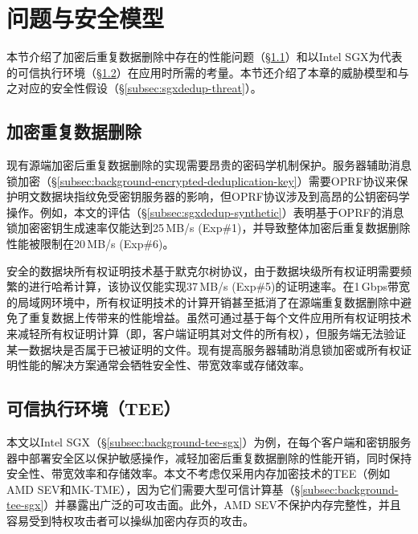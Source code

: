\section{问题与安全模型}
\label{sec:sgxdedup-background}

本节介绍了加密后重复数据删除中存在的性能问题（\S\ref{subsec:sgxdedup-problem}）和以Intel SGX为代表的可信执行环境（\S\ref{subsec:sgxdedup-sgx}）在应用时所需的考量。本节还介绍了本章的威胁模型和与之对应的安全性假设（\S\ref{subsec:sgxdedup-threat}）。

\subsection{加密重复数据删除}
\label{subsec:sgxdedup-problem}

现有源端加密后重复数据删除的实现需要昂贵的密码学机制保护。服务器辅助消息锁加密（\S\ref{subsec:background-encrypted-deduplication-key}）需要OPRF协议\cite{naor2004Number}来保护明文数据块指纹免受密钥服务器的影响，但OPRF协议涉及到高昂的公钥密码学操作。例如，本文的评估（\S\ref{subsec:sgxdedup-synthetic}）表明基于OPRF的消息锁加密密钥生成速率仅能达到25\,MB/s (Exp\#1)，并导致整体加密后重复数据删除性能被限制在20\,MB/s (Exp\#6)。

安全的数据块所有权证明技术基于默克尔树协议，由于数据块级所有权证明需要频繁的进行哈希计算，该协议仅能实现37\,MB/s (Exp\#5)的证明速率。在1\,Gbps带宽的局域网环境中，所有权证明技术的计算开销甚至抵消了在源端重复数据删除中避免了重复数据上传带来的性能增益。虽然可通过基于每个文件应用所有权证明技术来减轻所有权证明计算（即，客户端证明其对文件的所有权），但服务端无法验证某一数据块是否属于已被证明的文件。现有提高服务器辅助消息锁加密或所有权证明性能的解决方案通常会牺牲安全性\cite{li2020TED,xu2013weak,pietro12}、带宽效率\cite{harnik2010side,li15}或存储效率\cite{zhou2015secdep,qin17,li2020TED}。


\subsection{可信执行环境（TEE）}
\label{subsec:sgxdedup-sgx} 

本文以Intel SGX\cite{sgx}（\S\ref{subsec:background-tee-sgx}）为例，在每个客户端和密钥服务器中部署安全区以保护敏感操作，减轻加密后重复数据删除的性能开销，同时保持安全性、带宽效率和存储效率。本文不考虑仅采用内存加密技术的TEE（例如AMD SEV\cite{AMDSEV}和MK-TME\cite{MK-TME}），因为它们需要大型可信计算基（\S\ref{subsec:background-tee-sgx}）并暴露出广泛的可攻击面\cite{mofrad18}。此外，AMD SEV\cite{AMDSEV}不保护内存完整性，并且容易受到特权攻击者可以操纵加密内存页\cite{mofrad18}的攻击。


